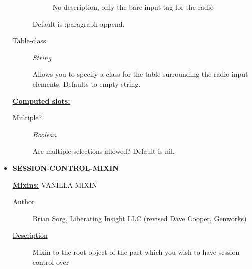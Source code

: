 \documentclass [11pt]{book}
\begin{document}
\begin{itemize}
\begin{description}
\begin{description}
\item[
]

No description, only the bare input tag for the radio

\end{description}


Default is :paragraph-append.




\item [Table-class]
\emph{String}

 Allows you to specify a class for the table surrounding the radio input elements. Defaults to empty string.




\end{description}






\textbf{
\underline{Computed slots:}}

\begin{description}

\item [Multiple?]
\emph{Boolean}

 Are multiple selections allowed? Default is nil.




\end{description}







\item {}
\textbf{SESSION-CONTROL-MIXIN}


\textbf{
\underline{Mixins:}} VANILLA-MIXIN





\begin{description}

\item [
\underline{Author}]


Brian Sorg, Liberating Insight LLC (revised Dave Cooper, Genworks)



\item [
\underline{Description}]


Mixin to the root object of the part which you wish to have session control over




\end{description}
\end{itemize}
\end{document}
